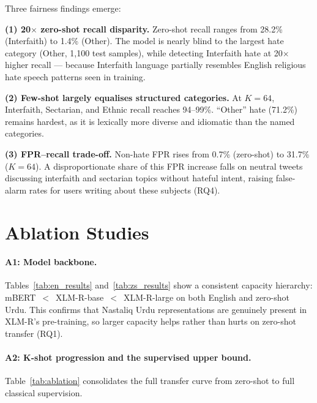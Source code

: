 \documentclass{article}
\begin{document}
Three fairness findings emerge:

\textbf{(1) 20$\times$ zero-shot recall disparity.}
Zero-shot recall ranges from 28.2\% (Interfaith) to 1.4\% (Other).
The model is nearly blind to the largest hate category (Other, 1,100 test
samples), while detecting Interfaith hate at 20$\times$ higher recall ---
because Interfaith language partially resembles English religious hate
speech patterns seen in training.

\textbf{(2) Few-shot largely equalises structured categories.}
At $K=64$, Interfaith, Sectarian, and Ethnic recall reaches 94--99\%.
``Other'' hate (71.2\%) remains hardest, as it is lexically more
diverse and idiomatic than the named categories.

\textbf{(3) FPR--recall trade-off.}
Non-hate FPR rises from 0.7\% (zero-shot) to 31.7\% ($K=64$).
A disproportionate share of this FPR increase falls on neutral tweets
discussing interfaith and sectarian topics without hateful intent,
raising false-alarm rates for users writing about these subjects (RQ4).

\section{Ablation Studies}
\label{sec:ablation}

\paragraph{A1: Model backbone.}
Tables~\ref{tab:en_results} and~\ref{tab:zs_results} show a consistent
capacity hierarchy: mBERT~$<$~XLM-R-base~$<$~XLM-R-large on both English
and zero-shot Urdu.
This confirms that Nastaliq Urdu representations are genuinely present in
XLM-R's pre-training, so larger capacity helps rather than hurts on
zero-shot transfer (RQ1).

\paragraph{A2: K-shot progression and the supervised upper bound.}
Table~\ref{tab:ablation} consolidates the full transfer curve from
zero-shot to full classical supervision.
\end{document}
